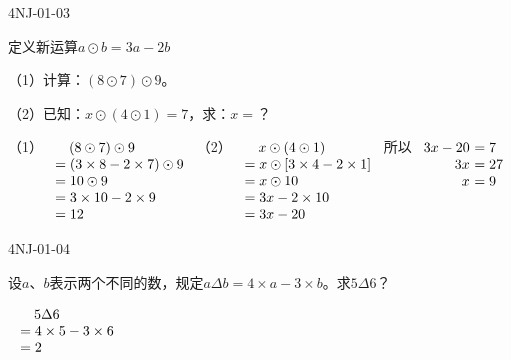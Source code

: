 \begin{defproblem}{4NJ-01-03}%
\begin{onlyproblem}%
定义新运算$a\odot b=3a-2b$

（1）计算：$(8\odot 7)\odot 9$。 

（2）已知：$x\odot (4\odot 1)=7$，求：$x=$？


\end{onlyproblem}%
\begin{onlysolution}%
（1）$\begin{array}[t]{r@{~}l}
&\quad(8\odot 7)\odot 9\\
&=(3\times8-2\times7)\odot9\\
&=10\odot9\\
&=3\times10-2\times9\\
&=12
\end{array}
$
（2）$\begin{array}[t]{r@{~}l}
&\quad x\odot (4\odot 1)\\
&=x\odot [3\times4-2\times1]\\
&=x\odot 10\\
&=3x-2\times10\\
&=3x-20
\end{array}
$
所以
$\begin{array}[t]{r@{~}l}
3x-20&=7\\
3x&=27\\
x&=9
\end{array}
$

\end{onlysolution}%
\end{defproblem}




\begin{defproblem}{4NJ-01-04}%
\begin{onlyproblem}%
设$a$、$b$表示两个不同的数，规定$a\Delta b=4\times a-3\times b$。求$5\Delta 6$？

\end{onlyproblem}%
\begin{onlysolution}%
$\begin{array}[t]{r@{~}l}
&\quad5\Delta 6\\
&=4\times5-3\times6\\
&=2
\end{array}
$
\end{onlysolution}%
\end{defproblem}






